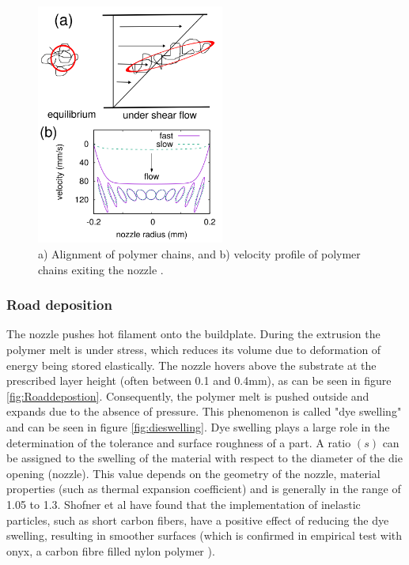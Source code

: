 \begin{figure}[H]
    \centering
    \includegraphics[width=0.55\textwidth]{chapter_2/figures/polymerallignment.PNG}
    \caption{a) Alignment of polymer chains, and b) velocity profile of polymer chains exiting the nozzle \cite{Mcilroy2017DisentanglementManufacturing}.}
    \label{fig:polymerallignment}
\end{figure}

\subsubsection{Road deposition}
    \label{Road deposition}
The nozzle pushes hot filament onto the buildplate. During the extrusion the polymer melt is under stress, which reduces its volume due to deformation of energy being stored elastically. The nozzle hovers above the substrate at the prescribed layer height (often between 0.1 and 0.4mm), as can be seen in figure \ref{fig:Roaddepostion}. Consequently, the polymer melt is pushed outside and expands due to the absence of pressure. This phenomenon is called "dye swelling" and can be seen in figure \ref{fig:dieswelling}. Dye swelling plays a large role in the determination of the tolerance and surface roughness of a part. A ratio $(s)$ can be assigned to the swelling of the material with respect to the diameter of the die opening (nozzle). This value depends on the geometry of the nozzle, material properties (such as thermal expansion coefficient) and is generally in the range of 1.05 to 1.3. Shofner et al \cite{Turner2014AModeling} have found that the implementation of inelastic particles, such as short carbon fibers, have a positive effect of reducing the dye swelling, resulting in smoother surfaces (which is confirmed in empirical test with onyx, a carbon fibre filled nylon polymer \cite{TNO2017ProcesbegeleidingLearned}). 

